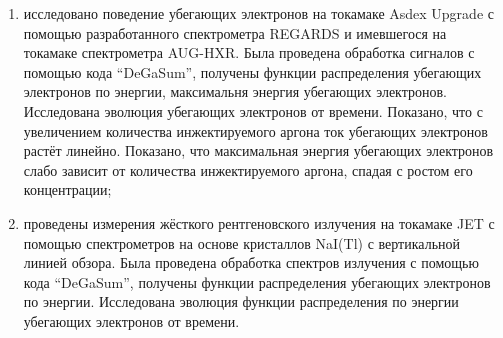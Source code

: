 \begin{enumerate}
  \item исследовано поведение убегающих электронов на токамаке Asdex Upgrade с помощью разработанного спектрометра REGARDS и имевшегося на токамаке спектрометра AUG-HXR. Была проведена обработка сигналов с помощью кода ``DeGaSum'', получены функции распределения убегающих электронов по энергии, максимальня энергия убегающих электронов. Исследована эволюция убегающих электронов от времени. Показано, что с увеличением количества инжектируемого аргона ток убегающих электронов растёт линейно. Показано, что максимальная энергия убегающих электронов слабо зависит от количества инжектируемого аргона, спадая с ростом его концентрации;

  \item проведены измерения жёсткого рентгеновского излучения на токамаке JET с помощью спектрометров на основе кристаллов NaI(Tl) с вертикальной линией обзора. Была проведена обработка спектров излучения с помощью кода ``DeGaSum'', получены функции распределения убегающих электронов по энергии. Исследована эволюция функции распределения по энергии убегающих электронов от времени.

\end{enumerate}
